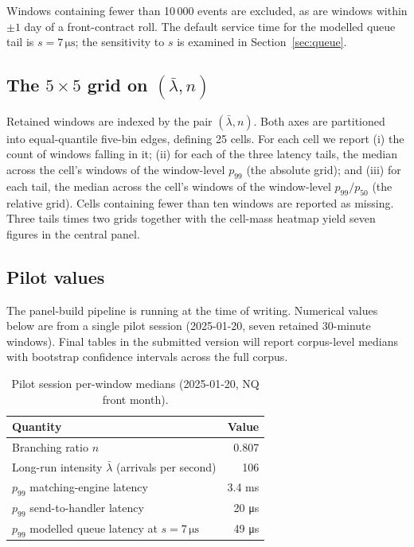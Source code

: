 \documentclass[11pt]{article}
\begin{document}
Windows containing fewer than 10\,000 events are excluded, as are windows within $\pm 1$ day of a front-contract roll. The default service time for the modelled queue tail is $s = 7\,\si{\micro\second}$; the sensitivity to $s$ is examined in Section~\ref{sec:queue}.

\subsection{The \texorpdfstring{$5 \times 5$}{5x5} grid on \texorpdfstring{$(\bar\lambda, n)$}{(lambda,n)}}
\label{sec:grid}

Retained windows are indexed by the pair $(\bar\lambda, n)$. Both axes are partitioned into equal-quantile five-bin edges, defining 25 cells. For each cell we report (i) the count of windows falling in it; (ii) for each of the three latency tails, the median across the cell's windows of the window-level $p_{99}$ (the absolute grid); and (iii) for each tail, the median across the cell's windows of the window-level $p_{99}/p_{50}$ (the relative grid). Cells containing fewer than ten windows are reported as missing. Three tails times two grids together with the cell-mass heatmap yield seven figures in the central panel.

\subsection{Pilot values}
\label{sec:pilot}

The panel-build pipeline is running at the time of writing. Numerical values below are from a single pilot session (2025-01-20, seven retained 30-minute windows). Final tables in the submitted version will report corpus-level medians with bootstrap confidence intervals across the full corpus.

\begin{table}[htbp]
\centering
\caption{Pilot session per-window medians (2025-01-20, NQ front month).}
\label{tab:pilot}
\begin{tabular}{@{}lr@{}}
\toprule
Quantity & Value \\
\midrule
Branching ratio $n$ & 0.807 \\
Long-run intensity $\bar\lambda$ (arrivals per second) & 106 \\
$p_{99}$ matching-engine latency & 3.4 ms \\
$p_{99}$ send-to-handler latency & 20 \si{\micro\second} \\
$p_{99}$ modelled queue latency at $s = 7\,\si{\micro\second}$ & 49 \si{\micro\second} \\
\bottomrule
\end{tabular}
\end{table}
\end{document}
